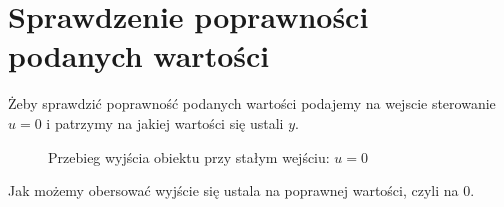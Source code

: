 \chapter{Sprawdzenie poprawności podanych wartości}
Żeby sprawdzić poprawność podanych wartości podajemy na wejscie sterowanie $u = 0$ i patrzymy na jakiej wartości się ustali $y$.

\begin{figure}[H]
\centering

\caption{Przebieg wyjścia obiektu przy stałym wejściu: $u = 0$}
\end{figure}

Jak możemy obersować wyjście się ustala na poprawnej wartości, czyli na 0.
